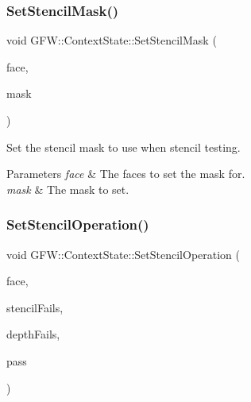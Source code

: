 \subsubsection{\texorpdfstring{Set\+Stencil\+Mask()}{SetStencilMask()}}
{\footnotesize\ttfamily void G\+F\+W\+::\+Context\+State\+::\+Set\+Stencil\+Mask (\begin{DoxyParamCaption}\item[{\hyperlink{namespace_g_f_w_a393ef12f1927ff3e7b73b11f72d551eb}{Face\+Direction}}]{face,  }\item[{int}]{mask }\end{DoxyParamCaption})}



Set the stencil mask to use when stencil testing. 


\begin{DoxyParams}{Parameters}
{\em face} & The faces to set the mask for. \\
\hline
{\em mask} & The mask to set. \\
\hline
\end{DoxyParams}
\mbox{\label{class_g_f_w_1_1_context_state_a5715fafc7014e913a4c2ad4b85c0bd8a}} 
\subsubsection{\texorpdfstring{Set\+Stencil\+Operation()}{SetStencilOperation()}}
{\footnotesize\ttfamily void G\+F\+W\+::\+Context\+State\+::\+Set\+Stencil\+Operation (\begin{DoxyParamCaption}\item[{\hyperlink{namespace_g_f_w_a393ef12f1927ff3e7b73b11f72d551eb}{Face\+Direction}}]{face,  }\item[{\hyperlink{namespace_g_f_w_a6a4cd1647d3100386320b711cdda20d4}{Test\+Operation}}]{stencil\+Fails,  }\item[{\hyperlink{namespace_g_f_w_a6a4cd1647d3100386320b711cdda20d4}{Test\+Operation}}]{depth\+Fails,  }\item[{\hyperlink{namespace_g_f_w_a6a4cd1647d3100386320b711cdda20d4}{Test\+Operation}}]{pass }\end{DoxyParamCaption})}



